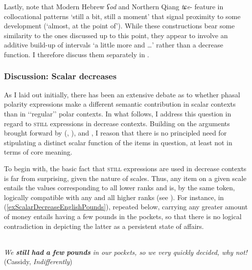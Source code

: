 Lastly, note that Modern Hebrew \textit{ʕod} and Northern Qiang \mbox{\textit{tɕe}-} feature in collocational patterns \lq still a bit, still a moment\rq{ }that signal proximity to some development (\lq almost, at the point of\rq{}). While these constructions bear some similarity to the ones discussed up to this point, they appear to involve an additive build-up of intervals \lq a little more and …\rq{ }rather than a decrease function. I therefore discuss them separately in .

\subsubsection{Discussion: Scalar decreases}\largerpage
As I laid out initially, there has been an extensive debate as to whether phasal polarity expressions make a different semantic contribution in scalar contexts than in \lq\lq{}regular\rq\rq{ }polar contexts. In what follows, I address this question in regard to \textsc{still} expressions in decrease contexts. Building on the arguments brought forward by \citeauthor{vanderAuwera1991BeyondDuality} (\citeyear{vanderAuwera1991BeyondDuality}, \citeyear{vanderAuwera1993}), \textcite{Garrido1992} and \textcite[ch. 3.1]{MosegaardHansen2008}, I reason that there is no principled need for stipulating a distinct scalar function of the items in question, at least not in terms of core meaning.

To begin with, the basic fact that \textsc{still} expressions are used in decrease contexts is far from surprising, given the nature of scales. Thus, any item on a given scale entails the values corresponding to all lower ranks and is, by the same token, logically compatible with any and all higher ranks (see ). For instance, in (\ref{exScalarDecreaseEnglishPounds}), repeated below, carrying any greater amount of money entails having a few pounds in the pockets, so that there is no logical contradiction in depicting the latter as a persistent state of affairs.

\begin{exe}[(14a)]
	\\
	\textit{We \textbf{still} \textbf{had} \textbf{a} \textbf{few} \textbf{pounds} in our pockets, so we very quickly decided, why not!} (Cassidy, \textit{Indifferently}) 
\end{exe}

